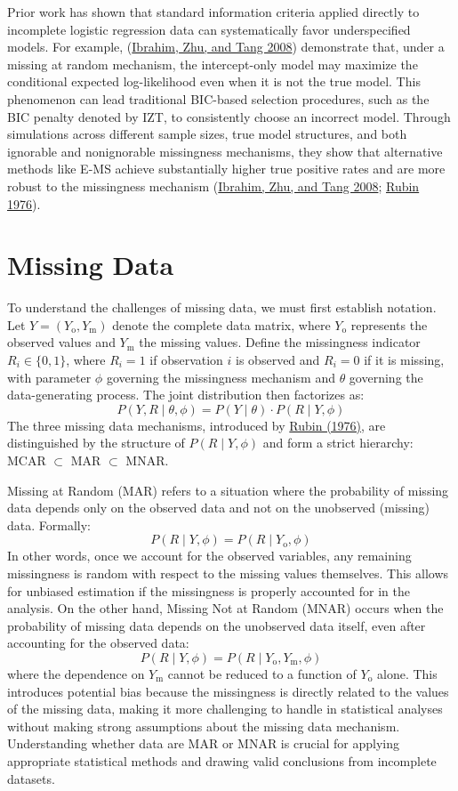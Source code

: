 \documentclass[
  12pt,
]{article}
\begin{document}
Prior work has shown that standard information criteria applied directly
to incomplete logistic regression data can systematically favor
underspecified models. For example,
(\protect\hyperlink{ref-IbrahimZhuTang2008}{Ibrahim, Zhu, and Tang
2008}) demonstrate that, under a missing at random mechanism, the
intercept-only model may maximize the conditional expected
log-likelihood even when it is not the true model. This phenomenon can
lead traditional BIC-based selection procedures, such as the BIC penalty
denoted by IZT, to consistently choose an incorrect model. Through
simulations across different sample sizes, true model structures, and
both ignorable and nonignorable missingness mechanisms, they show that
alternative methods like E-MS achieve substantially higher true positive
rates and are more robust to the missingness mechanism
(\protect\hyperlink{ref-IbrahimZhuTang2008}{Ibrahim, Zhu, and Tang
2008}; \protect\hyperlink{ref-rubin1976inference}{Rubin 1976}).

\section{Missing Data}

To understand the challenges of missing data, we must first establish
notation. Let $Y = (Y_{\text{o}}, Y_{\text{m}})$
denote the complete data matrix, where $Y_{\text{o}}$ represents
the observed values and $Y_{\text{m}}$ the missing values. Define
the missingness indicator $R_i \in \{0,1\}$, where $R_i = 1$ if observation
$i$ is observed and $R_i = 0$ if it is missing, with parameter
$\phi$ governing the missingness mechanism and $\theta$
governing the data-generating process. The joint distribution then factorizes as:
\[
P(Y, R \mid \theta, \phi) =
P(Y \mid \theta) \cdot
P(R \mid Y, \phi)
\]
The three missing data mechanisms, introduced by
\protect\hyperlink{ref-rubin1976inference}{Rubin (1976)},
are distinguished by the structure of
$P(R \mid Y, \phi)$
and form a strict hierarchy: MCAR $\subset$ MAR $\subset$ MNAR.

Missing at Random (MAR) refers to a situation where the probability of
missing data depends only on the observed data and not on the unobserved
(missing) data. Formally:
\[
P(R \mid Y, \phi) =
P(R \mid Y_{\text{o}}, \phi)
\]
In other words, once we account for the observed variables, any remaining
missingness is random with respect to the missing values themselves. This
allows for unbiased estimation if the missingness is properly accounted for
in the analysis. On the other hand, Missing Not at Random (MNAR) occurs when
the probability of missing data depends on the unobserved data itself, even
after accounting for the observed data:
\[
P(R \mid Y, \phi) =
P(R \mid Y_{\text{o}}, Y_{\text{m}},
\phi)
\]
where the dependence on $Y_{\text{m}}$ cannot be reduced to a
function of $Y_{\text{o}}$ alone. This introduces potential bias
because the missingness is directly related to the values of the missing
data, making it more challenging to handle in statistical analyses without
making strong assumptions about the missing data mechanism. Understanding
whether data are MAR or MNAR is crucial for applying appropriate statistical
methods and drawing valid conclusions from incomplete datasets.
\end{document}
